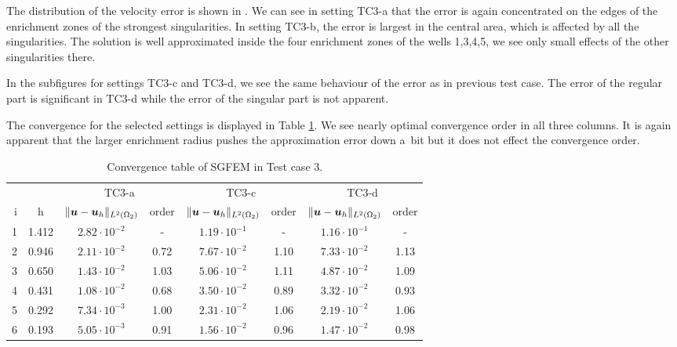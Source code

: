 The distribution of the velocity error is shown in . 
We can see in setting TC3-a that the error is again concentrated on the edges of the enrichment zones of
the strongest singularities. In setting TC3-b, the error is largest in the central area, 
which is affected by all the singularities. The solution is well approximated inside the four enrichment zones
of the wells 1,3,4,5, we see only small effects of the other singularities there.

In the subfigures for settings TC3-c and TC3-d, we see the same behaviour of the error as in previous test case.
The error of the regular part is significant in TC3-d while the error of the singular part is not apparent.

The convergence for the selected settings is displayed in Table \ref{tab:mh_tc3_convergence}.
We see nearly optimal convergence order in all three columns. It is again apparent that
the larger enrichment radius pushes the approximation error down a~bit but it does not effect the
convergence order.

\begin{table}[!htb]
\begin{center}
\bgroup
\def\arraystretch{1.2}
\setlength\tabcolsep{5pt}
\begin{tabular}{rc|cc|cc|cc}
\toprule
\multicolumn{2}{c|}{} & \multicolumn{2}{c|}{ TC3-a } & \multicolumn{2}{c|}{ TC3-c } & \multicolumn{2}{c}{TC3-d}\\ [3pt] %
i & h & $\|\mathbf{\boldsymbol{u}}-\mathbf{\boldsymbol{u}}_h\|_{L^2(\Omega_2)}$ & order & $\|\mathbf{\boldsymbol{u}}-\mathbf{\boldsymbol{u}}_h\|_{L^2(\Omega_2)}$
    & order & $\|\mathbf{\boldsymbol{u}}-\mathbf{\boldsymbol{u}}_h\|_{L^2(\Omega_2)}$ & order \\ [3pt] \midrule
1 & 1.412 & $2.82\cdot10^{-2}$  &  -   & $1.19\cdot10^{-1}$  &  -   & $1.16\cdot10^{-1}$ &   -   \\
2 & 0.946 & $2.11\cdot10^{-2}$  & 0.72 & $7.67\cdot10^{-2}$  & 1.10 & $7.33\cdot10^{-2}$ &  1.13 \\
3 & 0.650 & $1.43\cdot10^{-2}$  & 1.03 & $5.06\cdot10^{-2}$  & 1.11 & $4.87\cdot10^{-2}$ &  1.09 \\
4 & 0.431 & $1.08\cdot10^{-2}$  & 0.68 & $3.50\cdot10^{-2}$  & 0.89 & $3.32\cdot10^{-2}$ &  0.93 \\
5 & 0.292 & $7.34\cdot10^{-3}$  & 1.00 & $2.31\cdot10^{-2}$  & 1.06 & $2.19\cdot10^{-2}$ &  1.06 \\
6 & 0.193 & $5.05\cdot10^{-3}$  & 0.91 & $1.56\cdot10^{-2}$  & 0.96 & $1.47\cdot10^{-2}$ &  0.98 \\
\bottomrule
\end{tabular}
\caption{Convergence table of SGFEM in Test case 3.}
\label{tab:mh_tc3_convergence}
\egroup
\end{center}
\end{table}

